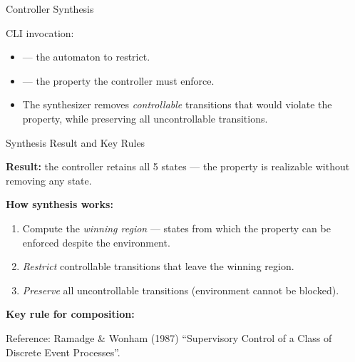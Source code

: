 \begin{frame}[fragile]{Controller Synthesis}



\vspace{0.5em}
CLI invocation:


\vspace{0.5em}
\begin{itemize}
  \item {} --- the automaton to restrict.
  \item {} --- the property the controller must enforce.
  \item The synthesizer removes \emph{controllable} transitions that would
        violate the property, while preserving all uncontrollable transitions.
\end{itemize}

\end{frame}

\begin{frame}{Synthesis Result and Key Rules}

\textbf{Result:} the controller retains all 5 states --- the property is
\alert{realizable} without removing any state.

\vspace{1em}
\textbf{How synthesis works:}
\begin{enumerate}
  \item Compute the \emph{winning region} --- states from which the property
        can be enforced despite the environment.
  \item \emph{Restrict} controllable transitions that leave the winning region.
  \item \emph{Preserve} all uncontrollable transitions (environment cannot be blocked).
\end{enumerate}

\vspace{1em}
\textbf{Key rule for composition:}
\begin{center}
\end{center}

\medskip
{\scriptsize\color{ubaGray} Reference: Ramadge \& Wonham (1987) ``Supervisory Control of a Class of Discrete Event Processes''.}

\end{frame}


